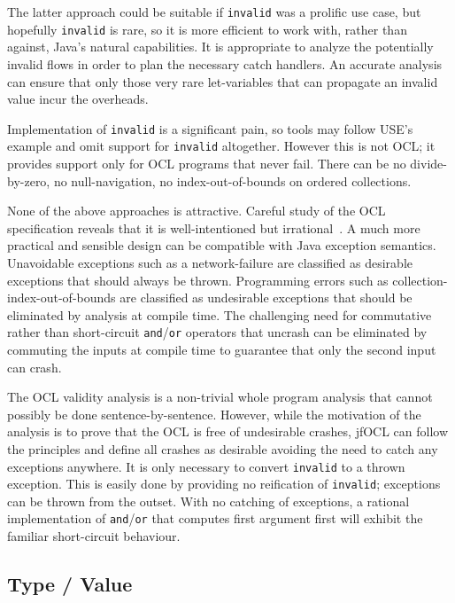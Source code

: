 \documentclass[sigconf]{acmart}
\begin{document}
The latter approach could be suitable if \texttt{invalid} was a prolific use case, but hopefully \texttt{invalid} is rare, so it is more efficient to work with, rather than against, Java's natural capabilities. It is appropriate to analyze the potentially invalid flows in order to plan the necessary catch handlers. An accurate analysis can ensure that only those very rare let-variables that can propagate an invalid value incur the overheads.

Implementation of \texttt{invalid} is a significant pain, so tools may follow USE's\cite{USE} example and omit support for \texttt{invalid} altogether. However this is not OCL; it provides support only for OCL programs that never fail. There can be no divide-by-zero, no null-navigation, no index-out-of-bounds on ordered collections.

None of the above approaches is attractive. Careful study of the OCL specification reveals that it is well-intentioned but irrational~\cite{Willink2021}. A much more practical and sensible design can be compatible with Java exception semantics. Unavoidable exceptions such as a network-failure are classified as desirable exceptions that should always be thrown. Programming errors such as collection-index-out-of-bounds are classified as undesirable exceptions that should be eliminated by analysis at compile time. The challenging need for commutative rather than short-circuit \verb|and|/\verb|or| operators that uncrash can be eliminated by commuting the inputs at compile time to guarantee that only the second input can crash.

The OCL validity analysis \cite{Willink2021} is a non-trivial whole program analysis that cannot possibly be done sentence-by-sentence. However, while the motivation of the analysis is to prove that the OCL is free of undesirable crashes, jfOCL can follow the principles and define all crashes as desirable avoiding the need to catch any exceptions anywhere. It is only necessary to convert \texttt{invalid} to a thrown exception. This is easily done by providing no reification of \texttt{invalid}; exceptions can be thrown from the outset. With no catching of exceptions, a rational implementation of \verb|and|/\verb|or| that computes first argument first will exhibit the familiar short-circuit behaviour.

\subsection{Type / Value}
\end{document}

